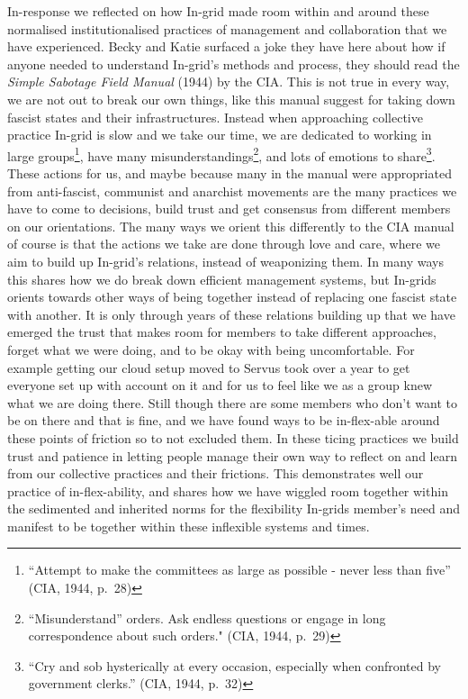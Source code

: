 In-response we reflected on how In-grid made room within and around
these normalised institutionalised practices of management and
collaboration that we have experienced. Becky and Katie surfaced a joke
they have here about how if anyone needed to understand In-grid's
methods and process, they should read the \emph{Simple Sabotage Field
Manual} (1944) by the CIA. This is not true in every way, we are not out
to break our own things, like this manual suggest for taking down
fascist states and their infrastructures. Instead when approaching
collective practice In-grid is slow and we take our time, we are
dedicated to working in large groups\footnote{``Attempt to make the
  committees as large as possible - never less than five'' (CIA, 1944,
  p.~28)}, have many misunderstandings\footnote{``Misunderstand''
  orders. Ask endless questions or engage in long correspondence about
  such orders." (CIA, 1944, p.~29)}, and lots of emotions to
share\footnote{``Cry and sob hysterically at every occasion, especially
  when confronted by government clerks.'' (CIA, 1944, p.~32)}. These
actions for us, and maybe because many in the manual were appropriated
from anti-fascist, communist and anarchist movements are the many
practices we have to come to decisions, build trust and get consensus
from different members on our orientations. The many ways we orient this
differently to the CIA manual of course is that the actions we take are
done through love and care, where we aim to build up In-grid's
relations, instead of weaponizing them. In many ways this shares how we
do break down efficient management systems, but In-grids orients towards
other ways of being together instead of replacing one fascist state with
another. It is only through years of these relations building up that we
have emerged the trust that makes room for members to take different
approaches, forget what we were doing, and to be okay with being
uncomfortable. For example getting our cloud setup moved to Servus took
over a year to get everyone set up with account on it and for us to feel
like we as a group knew what we are doing there. Still though there are
some members who don't want to be on there and that is fine, and we have
found ways to be in-flex-able around these points of friction so to not
excluded them. In these ticing practices we build trust and patience in
letting people manage their own way to reflect on and learn from our
collective practices and their frictions. This demonstrates well our
practice of in-flex-ability, and shares how we have wiggled room
together within the sedimented and inherited norms for the flexibility
In-grids member's need and manifest to be together within these
inflexible systems and times.

